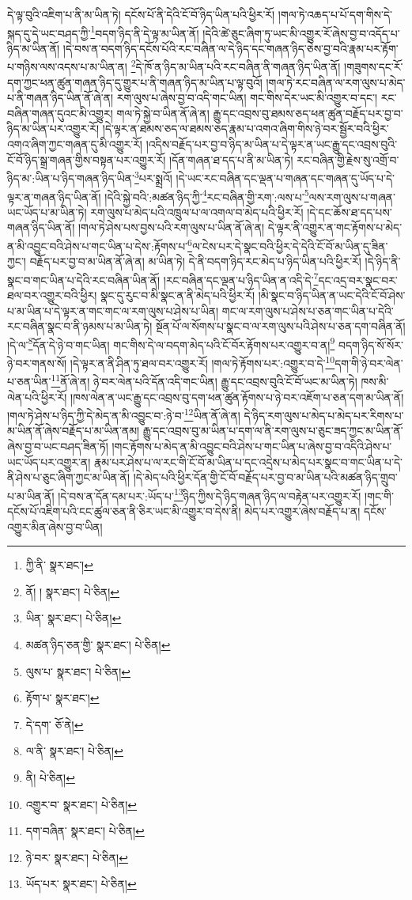དེ་ལྟ་བུའི་འཇིག་པ་ནི་མ་ཡིན་ཏེ། དངོས་པོ་ནི་དེའི་ངོ་བོ་ཉིད་ཡིན་པའི་ཕྱིར་རོ། །གལ་ཏེ་འཆད་པ་པོ་དག་གིས་དེ་སྐད་དུ་དེ་ཡང་བཤད་ཀྱི་\footnote{ཀྱི་ནི་  སྣར་ཐང་། }བདག་ཉིད་ནི་དེ་ལྟ་མ་ཡིན་ནོ། །དེའི་ཚེ་ཅུང་ཞིག་ཏུ་ཡང་མི་འགྱུར་རོ་ཞེས་བྱ་བ་འདོད་པ་ཉིད་མ་ཡིན་ནོ། །དེ་བས་ན་བདག་ཉིད་དངོས་པོའི་རང་བཞིན་ལ་དེ་ཉིད་དང་གཞན་ཉིད་ཅེས་བྱ་བའི་རྣམ་པར་རྟོག་པ་གཉིས་ལས་འདས་པ་མ་ཡིན་ན། \footnote{ནོ། །   སྣར་ཐང་།  པེ་ཅིན། }དེ་ཁོ་ན་ཉིད་མ་ཡིན་པའི་རང་བཞིན་ནི་གཞན་ཉིད་ཡིན་ནོ། །གཟུགས་དང་རོ་དག་ཀྱང་ཕན་ཚུན་གཞན་ཉིད་དུ་གྱུར་པ་ནི་གཞན་ཉིད་མ་ཡིན་པ་ལྟ་བུའོ། །གལ་ཏེ་རང་བཞིན་ལ་རག་ལུས་པ་མེད་པ་ནི་གཞན་ཉིད་ཡིན་ནོ་ཞེ་ན། རག་ལུས་པ་ཞེས་བྱ་བ་འདི་གང་ཡིན། གང་གིས་དེར་ཡང་མི་འགྱུར་བ་དང་། རང་བཞིན་གཞན་དུའང་མི་འགྱུར། གལ་ཏེ་སྐྱེ་བ་ཡིན་ནོ་ཞེ་ན། རྒྱུ་དང་འབྲས་བུ་ཐམས་ཅད་ཕན་ཚུན་བརྗོད་པར་བྱ་བ་ཉིད་མ་ཡིན་པར་འགྱུར་རོ། །དེ་ལྟར་ན་ཐམས་ཅད་ལ་ཐམས་ཅད་རྣམ་པ་འགའ་ཞིག་གིས་ཉེ་བར་སྦྱོར་བའི་ཕྱིར་འགའ་ཞིག་ཀྱང་གཞན་དུ་མི་འགྱུར་རོ། །འདིས་བརྗོད་པར་བྱ་བ་ཉིད་མ་ཡིན་པ་དེ་ལྟར་ན་ཡང་རྒྱུ་དང་འབྲས་བུའི་ངོ་བོ་ཉིད་སྒྲ་གཞན་གྱིས་བསྟན་པར་འགྱུར་རོ། །དོན་གཞན་ཐ་དད་པ་ནི་མ་ཡིན་ཏེ། རང་བཞིན་གྱི་རྗེས་སུ་འགྲོ་བ་ཉིད་མ་:ཡིན་པ་ཉིད་གཞན་ཉིད་ཡིན་\footnote{ཡིན་  སྣར་ཐང་།  པེ་ཅིན། }པར་སྨྲའོ། །དེ་ཡང་རང་བཞིན་དང་ལྡན་པ་གཞན་དང་གཞན་དུ་ཡོད་པ་དེ་ལྟར་ན་གཞན་ཉིད་ཡིན་ནོ། །དེའི་སྐྱེ་བའི་:མཚན་ཉིད་ཀྱི་\footnote{མཚན་ཉིད་ཅན་གྱི་  སྣར་ཐང་།  པེ་ཅིན། }རང་བཞིན་གྱི་རག་:ལས་པ་\footnote{ལུས་པ་  སྣར་ཐང་།  པེ་ཅིན། }ལས་རག་ལུས་པ་གཞན་ཡང་ཡོད་པ་མ་ཡིན་ཏེ། རག་ལུས་པ་མེད་པའི་འཁྲུལ་པ་ལ་འགལ་བ་མེད་པའི་ཕྱིར་རོ། །དེ་དང་ཆོས་ཐ་དད་པས་གཞན་ཉིད་ཡིན་ནོ། །གལ་ཏེ་ཤེས་པས་བྱས་པའི་རག་ལུས་པ་ཡིན་ནོ་ཞེ་ན། དེ་ལྟར་ནི་འགྱུར་ན་གང་རྟོགས་པ་མེད་ན་མི་འབྱུང་བའི་ཤེས་པ་གང་ཡིན་པ་དེས་:རྟོགས་པ་\footnote{རྟོག་པ་  སྣར་ཐང་། }ལ་ངེས་པར་དེ་སྣང་བའི་ཕྱིར་དེ་དེའི་ངོ་བོ་མ་ཡིན་དུ་ཟིན་ཀྱང་། བརྗོད་པར་བྱ་བ་མ་ཡིན་ནོ་ཞེ་ན། མ་ཡིན་ཏེ། དེ་ནི་བདག་ཉིད་རང་མེད་པ་ཉིད་ཡིན་པའི་ཕྱིར་རོ། །དེ་ཉིད་ནི་སྣང་བ་གང་ཡིན་པ་དེའི་རང་བཞིན་ཡིན་ནོ། །རང་བཞིན་དང་ལྡན་པ་ཉིད་ཡིན་ན་འདི་དེ་\footnote{དེ་དག་  ཅོ་ནེ། }དང་འདྲ་བར་སྣང་བར་ཐལ་བར་འགྱུར་བའི་ཕྱིར། སྣང་དུ་རུང་བ་མི་སྣང་ན་ནི་མེད་པའི་ཕྱིར་རོ། །མི་སྣང་བ་ཉིད་ཡིན་ན་ཡང་དེའི་ངོ་བོ་ཤེས་པ་མ་ཡིན་པ་དེ་ལྟར་ན་གང་གང་ལ་རག་ལུས་པ་ཤེས་པ་ཡིན། གང་ལ་རག་ལུས་པ་ཤེས་པ་ཅན་གང་ཡིན་པ་དེའི་རང་བཞིན་སྣང་བ་ནི་ཉམས་པ་མ་ཡིན་ཏེ། སྔོན་པོ་ལ་སོགས་པ་སྣང་བ་ལ་རག་ལུས་པའི་ཤེས་པ་ཅན་དག་བཞིན་ནོ། །དེ་ལ་\footnote{ལ་ནི་  སྣར་ཐང་།  པེ་ཅིན། }དོན་དེ་ཉེ་བ་གང་ཡིན། གང་གིས་དེ་ལ་བདག་མེད་པའི་ངོ་བོར་རྟོགས་པར་འགྱུར་བ་ན།\footnote{ནི།  པེ་ཅིན། } བདག་ཉིད་སོ་སོར་ཉེ་བར་གནས་སོ། །དེ་ལྟར་ན་ནི་ཤིན་ཏུ་ཐལ་བར་འགྱུར་རོ། །གལ་ཏེ་རྟོགས་པར་:འགྱུར་བ་དེ་\footnote{འགྱུར་བ་  སྣར་ཐང་།  པེ་ཅིན། }དག་གི་ཉེ་བར་ལེན་པ་ཅན་ཡིན་\footnote{དག་བཞིན་  སྣར་ཐང་།  པེ་ཅིན། }ནོ་ཞེ་ན། ཉེ་བར་ལེན་པའི་དོན་འདི་གང་ཡིན། རྒྱུ་དང་འབྲས་བུའི་ངོ་བོ་ཡང་མ་ཡིན་ཏེ། ཁས་མི་ལེན་པའི་ཕྱིར་རོ། །ཁས་ལེན་ན་ཡང་རྒྱུ་དང་འབྲས་བུ་དག་ཕན་ཚུན་རྟོགས་པ་ཉེ་བར་འཇོག་པ་ཅན་དག་མ་ཡིན་ནོ། །གལ་ཏེ་ཤེས་པ་ཉིད་ཀྱི་དེ་མེད་ན་མི་འབྱུང་བ་:ཉེ་བ་\footnote{ཉེ་བར་  སྣར་ཐང་།  པེ་ཅིན། }ཡིན་ནོ་ཞེ་ན། དེ་ཉིད་རག་ལུས་པ་མེད་པ་མེད་པར་རིགས་པ་མ་ཡིན་ནོ་ཞེས་བརྗོད་པ་མ་ཡིན་ནམ། རྒྱུ་དང་འབྲས་བུ་མ་ཡིན་པ་དག་ལ་ནི་རག་ལུས་པ་ཅུང་ཟད་ཀྱང་མ་ཡིན་ནོ་ཞེས་བྱ་བ་ཡང་བཤད་ཟིན་ཏོ། །གང་རྟོགས་པ་མེད་ན་མི་འབྱུང་བའི་ཤེས་པ་གང་ཡིན་པ་ཞེས་བྱ་བ་འདིའི་ཤེས་པ་ཡང་ཡོད་པར་འགྱུར་ན། རྣམ་པར་ཤེས་པ་ལ་རང་གི་ངོ་བོ་མ་ཡིན་པ་དང་འདྲེས་པ་མེད་པར་སྣང་བ་གང་ཡིན་པ་དེ་ནི་ཤེས་པ་ཅུང་ཞིག་ཀྱང་མ་ཡིན་ནོ། །དེ་མེད་པའི་ཕྱིར་དོན་གྱི་ངོ་བོ་བརྗོད་པར་བྱ་བ་མ་ཡིན་པའི་མཚན་ཉིད་གྲུབ་པ་མ་ཡིན་ནོ། །དེ་བས་ན་དོན་དམ་པར་:ཡོད་པ་\footnote{ཡོད་པར་  སྣར་ཐང་།  པེ་ཅིན། }ཉིད་ཀྱིས་དེ་ཉིད་གཞན་ཉིད་ལ་བརྟེན་པར་འགྱུར་རོ། །གང་གི་དངོས་པོ་འཇིག་པའི་ངང་ཚུལ་ཅན་ནི་ཅིར་ཡང་མི་འགྱུར་བ་དེས་ནི། མེད་པར་འགྱུར་ཞེས་བརྗོད་པ་ན། དངོས་འགྱུར་མིན་ཞེས་བྱ་བ་ཡིན། 